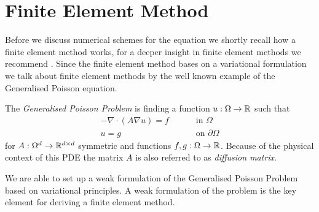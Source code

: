 \section{Finite Element Method}
Before we discuss numerical schemes for the \MA equation we shortly recall how a finite element method works, for a deeper insight in finite element methods we recommend \cite{Braess2003, BS2002}. Since the finite element method bases on a variational formulation we talk about finite element methods by the well known example of the Generalised Poisson equation. 


\begin{definition} \label{def: General Poisson Problem}
The \emph{Generalised Poisson Problem} is finding a function $u:\Omega \rightarrow \mathbb{R}$ such that 
\begin{align}
	-\nabla \cdot (A \nabla u) = f \qquad &\text{ in }\Omega \label{eq: poisson eq} \\
	u = g \qquad &\text{ on } \partial \Omega    \label{eq: poisson bc}
\end{align}
for $ A:\Omega^d \rightarrow \mathbb{R}^{d \times d}$ symmetric and functions $f,g:\Omega \rightarrow \mathbb{R} $. 
Because of the physical context of this PDE the matrix $A$ is also referred to as \emph{diffusion matrix}.
\end{definition}

We are able to set up a weak formulation of the Generalised Poisson Problem based on variational principles. A weak formulation of the problem is the key element for deriving a finite element method.

